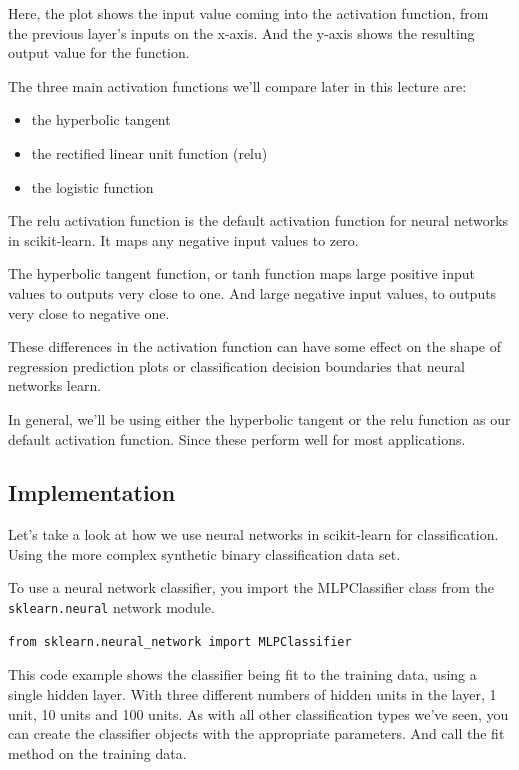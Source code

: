 \begin{multicols}{2}
Here, the plot shows the input value coming into the activation function, from the previous layer's inputs on the x-axis. And the y-axis shows the resulting output value for the function. 

The three main activation functions we'll compare later in this lecture are:
\begin{itemize}
\item the hyperbolic tangent
\item the rectified linear unit function (relu)
\item the logistic function
\end{itemize}

The relu activation function is the default activation function for neural networks in scikit-learn. It maps any negative input values to zero. 

The hyperbolic tangent function, or tanh function maps large positive input values to outputs very close to one. And large negative input values, to outputs very close to negative one. 

These differences in the activation function can have some effect on the shape of regression prediction plots or classification decision boundaries that neural networks learn. 

In general, we'll be using either the hyperbolic tangent or the relu function as our default activation function. Since these perform well for most applications. 

\subsection{Implementation}

Let's take a look at how we use neural networks in scikit-learn for classification. Using the more complex synthetic binary classification data set. 

To use a neural network classifier, you import the MLPClassifier class from the \texttt{sklearn.neural} network module. 

{\scriptsize
\begin{verbatim}
from sklearn.neural_network import MLPClassifier
\end{verbatim}
}

This code example shows the classifier being fit to the training data, using a single hidden layer. With three different numbers of hidden units in the layer, 1 unit, 10 units and 100 units. As with all other classification types we've seen, you can create the classifier objects with the appropriate parameters. And call the fit method on the training data. 


\end{multicols}
